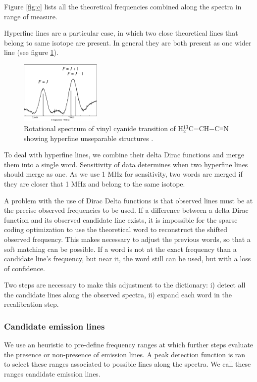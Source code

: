 Figure \ref{fig:c} lists all the theoretical frequencies combined along the spectra in range of measure.

Hyperfine lines are a particular case, in which two close theoretical lines that belong to same isotope are present. In general they are both present as one wider line (see figure \ref{fig:87_77_13C3}).

\begin{figure}[H]
	\begin{center}
		\includegraphics[width=0.35\textwidth]{images/87-77_13C3}
		\caption{Rotational spectrum of vinyl cyanide transition of H$_2^{13}$C=CH−C≡N showing hyperfine unseparable structures \citep{muller_rotational_2008}.}
		\label{fig:87_77_13C3}
	\end{center}
\end{figure}

To deal with hyperfine lines, we combine their delta Dirac functions and merge them into a single word.
Sensitivity of data determines when two hyperfine lines should merge as one.
As we use 1 MHz for sensitivity, two words are merged if they are closer that 1 MHz and belong to the same isotope.

A problem with the use of Dirac Delta functions is that observed lines must be at the precise observed frequencies to be used.
If a difference between a delta Dirac function and its observed candidate line exists, it is impossible for the sparse coding optimization to use the theoretical word to reconstruct the shifted observed frequency.
This makes necessary to adjust the previous words, so that a soft matching can be possible.
If a word is not at the exact frequency than a candidate line's frequency, but near it, the word still can be used, but with a loss of confidence.

Two steps are necessary to make this adjustment to the dictionary: 
i) detect all the candidate lines along the observed spectra, 
ii) expand each word in the recalibration step.

\subsubsection{Candidate emission lines}
We use an heuristic to pre-define frequency ranges at which further steps evaluate the presence or non-presence of emission lines.
A peak detection function is ran to select these ranges associated to possible lines along the spectra. We call these ranges candidate emission lines.

